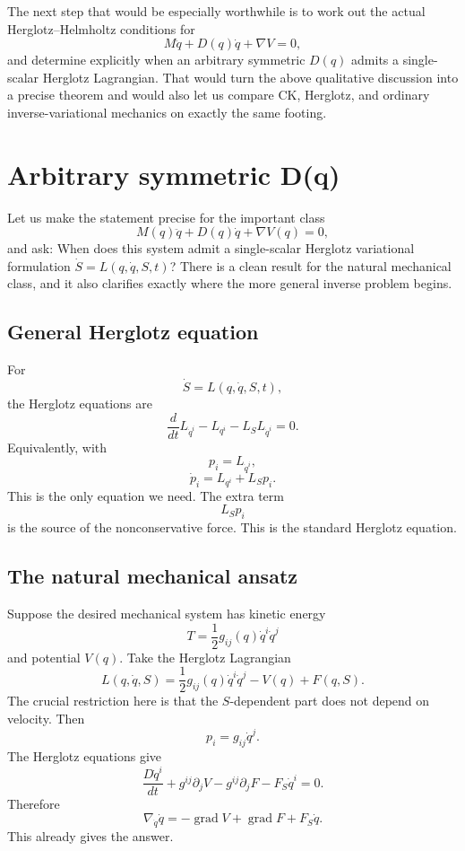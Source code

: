 The next step that would be especially worthwhile is to work out the actual Herglotz–Helmholtz conditions for
$$ M\ddot q+D(q)\dot q+\nabla V=0, $$
and determine explicitly when an arbitrary symmetric \(D(q)\) admits a single-scalar Herglotz Lagrangian. That would turn the above qualitative discussion into a precise theorem and would also let us compare CK, Herglotz, and ordinary inverse-variational mechanics on exactly the same footing.

\section{Arbitrary symmetric D(q)}
Let us make the statement precise for the important class
$$ M(q)\ddot q+D(q)\dot q+\nabla V(q)=0, $$
and ask:
When does this system admit a single-scalar Herglotz variational formulation \( \dot S=L(q,\dot q,S,t)\)?
There is a clean result for the natural mechanical class, and it also clarifies exactly where the more general inverse problem begins.

\subsection{General Herglotz equation}

For$$ \dot S=L(q,\dot q,S,t), $$
the Herglotz equations are
\begin{equation}
 \boxed{ \frac{d}{dt}L_{\dot q^i} -L_{q^i} -L_S L_{\dot q^i}=0. } \tag{1} 
\end{equation}
Equivalently, with $$ p_i=L_{\dot q^i}, $$
\begin{equation}
  \boxed{ \dot p_i=L_{q^i}+L_Sp_i. } \tag{2} 
\end{equation}
This is the only equation we need.
The extra term $$ L_Sp_i $$
is the source of the nonconservative force. This is the standard Herglotz equation.

\subsection{The natural mechanical ansatz}

Suppose the desired mechanical system has kinetic energy
$$ T=\frac12 g_{ij}(q)\dot q^i\dot q^j $$
and potential \(V(q)\).
Take the Herglotz Lagrangian
\begin{equation}
 \boxed{ L(q,\dot q,S) = \frac12g_{ij}(q)\dot q^i\dot q^j -V(q) +F(q,S). } \tag{3} 
\end{equation}
The crucial restriction here is that the \(S\)-dependent part does not depend on velocity.
Then $$ p_i=g_{ij}\dot q^j. $$
The Herglotz equations give
$$ \frac{D\dot q^i}{dt} + g^{ij}\partial_jV - g^{ij}\partial_jF - F_S\dot q^i =0. $$
Therefore
\begin{equation}
 \boxed{ \nabla_{\dot q}\dot q = -\operatorname{grad}V +\operatorname{grad}F +F_S\dot q. } \tag{4} 
\end{equation}
This already gives the answer.

